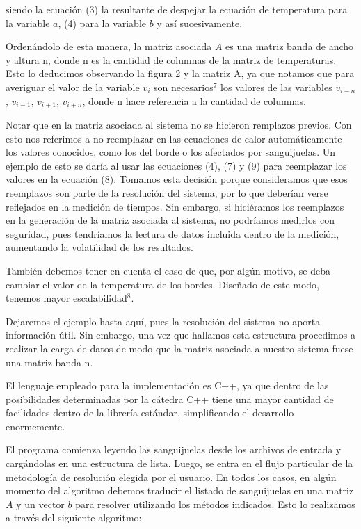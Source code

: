 siendo la ecuación (3) la resultante de despejar la ecuación de temperatura para la variable $a$, (4) para la variable $b$ y así sucesivamente.

Ordenándolo de esta manera, la matriz asociada $A$ es una matriz banda de ancho y altura n, donde n es la cantidad de columnas  de la matriz de temperaturas. Esto lo deducimos observando la figura 2 y la matriz A, ya que notamos que para averiguar el valor de la variable $v_{i}$ son necesarios$^7$ los valores de las variables $v_{i-n}$, $v_{i-1}$, $v_{i+1}$, $v_{i+n}$, donde n hace referencia a la cantidad de columnas. 

Notar que en la matriz asociada al sistema no se hicieron remplazos previos. Con esto nos referimos a no reemplazar en las ecuaciones de calor automáticamente los valores conocidos, como los del borde o los afectados por sanguijuelas. Un ejemplo de esto se daría al usar las ecuaciones (4), (7) y (9) para reemplazar los valores en la ecuación (8). Tomamos esta decisión porque consideramos que esos reemplazos son parte de la resolución del sistema, por lo que deberían verse reflejados en la medición de tiempos. Sin embargo, si hiciéramos los reemplazos en la generación de la matriz asociada al sistema, no podríamos medirlos con seguridad, pues tendríamos la lectura de datos incluida dentro de la medición, aumentando la volatilidad de los resultados. 

También debemos tener en cuenta el caso de que, por algún motivo, se deba cambiar el valor de la temperatura de los bordes. Dise\~nado de este modo, tenemos mayor escalabilidad$^8$. 

Dejaremos el ejemplo hasta aquí, pues la resolución del sistema no aporta información útil. Sin embargo, una vez que hallamos esta estructura procedimos a realizar la carga de datos de modo que la matriz asociada a nuestro sistema fuese una matriz banda-n.


El lenguaje empleado para la implementación es C++, ya que dentro de las posibilidades determinadas por la cátedra C++ tiene una mayor cantidad de facilidades dentro de la librería estándar, simplificando el desarrollo enormemente.


El programa comienza leyendo las sanguijuelas desde los archivos de entrada y cargándolas en una estructura de lista. Luego, se entra en el flujo particular de la metodología de resolución elegida por el usuario. En todos los casos, en algún momento del algoritmo debemos traducir el listado de sanguijuelas en una matriz $A$ y un vector $b$ para resolver utilizando los métodos indicados. Esto lo realizamos a través del siguiente algoritmo:

